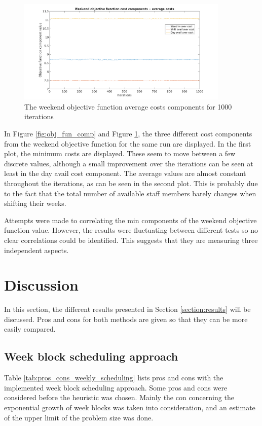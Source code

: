 \begin{figure}[!h]
\centering
\includegraphics[width=0.9\textwidth, trim = 100px 0px 100px 20px, clip]{Chapters/ImagesEmelie/Components_av_1000_20.png}
\caption{The weekend objective function average costs components for 1000 iterations}
\label{fig:obj_fun_comp_aver}
\end{figure}


In Figure \ref{fig:obj_fun_comp} and Figure \ref{fig:obj_fun_comp_aver}, the three different cost components from the weekend objective function for the same run are displayed. In the first plot, the minimum costs are displayed. These seem to move between a few discrete values, although a small improvement over the iterations can be seen at least in the day avail cost component. The average values are almost constant throughout the iterations, as can be seen in the second plot. This is probably due to the fact that the total number of available staff members barely changes when shifting their weeks.

Attempts were made to correlating the min components of the weekend objective function value. However, the results were fluctuating between different tests so no clear correlations could be identified. This suggests that they are measuring three independent aspects.

\section{Discussion}
In this section, the different results presented in Section \ref{section:results} will be discussed. Pros and cons for both methods are given so that they can be more easily compared.


\subsection{Week block scheduling approach}
Table \ref{tab:pros_cons_weekly_scheduling} lists pros and cons with the implemented week block scheduling approach. Some pros and cons were considered before the heuristic was chosen. Mainly the con concerning the exponential growth of week blocks was taken into consideration, and an estimate of the upper limit of the problem size was done.

